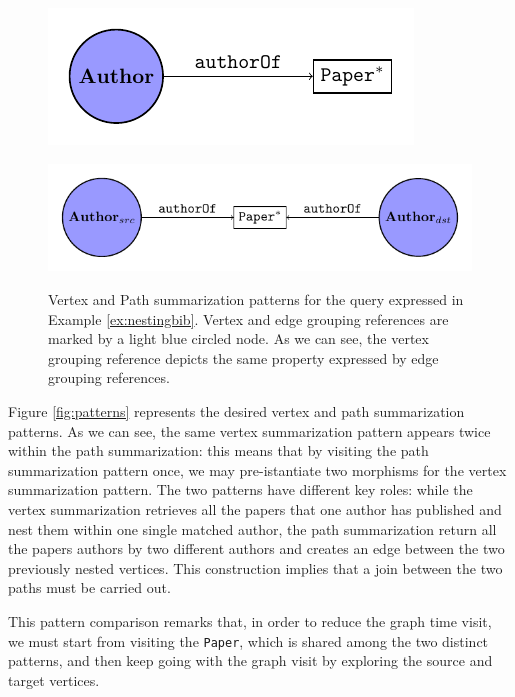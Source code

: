 \begin{figure}[!t]
	\centering
	\begin{minipage}[!t]{0.5\textwidth}
		\centering
		\includegraphics[width=.7\textwidth]{fig/06nesting/00_vertex_pattern.pdf}
		\label{fig:vertexPat}
	\end{minipage} \begin{minipage}[!t]{0.5\textwidth}
		\centering
		\includegraphics[width=1\textwidth]{fig/06nesting/00_path_pattern.pdf}
		\label{fig:pathPat}
	\end{minipage}
	\caption{Vertex and Path summarization patterns for the query expressed in Example \vref{ex:nestingbib}. Vertex and edge grouping references are marked by a light blue circled node. As we can see, the vertex grouping reference depicts the same property expressed by edge grouping references.}
	\label{fig:patterns}
\end{figure}
\begin{example}[continues=ex:nestingbib]
Figure \vref{fig:patterns} represents the desired vertex and path summarization patterns. As we can see, the same vertex summarization pattern appears twice within the path summarization: this means that by visiting the path summarization pattern once, we may pre-istantiate two morphisms for the vertex summarization pattern. The two patterns have different key roles: while the vertex summarization retrieves all the papers that one author has published and nest them within one single matched author, the path summarization return all the papers authors by two different authors and creates an edge between the two previously nested vertices. This construction implies that a join between the two paths must be carried out. 

This pattern comparison remarks that, in order to reduce the graph time visit, we must start from visiting the \texttt{Paper}, which is shared among the two distinct patterns, and then keep going with the graph visit by exploring the source and target vertices. 
\end{example}

